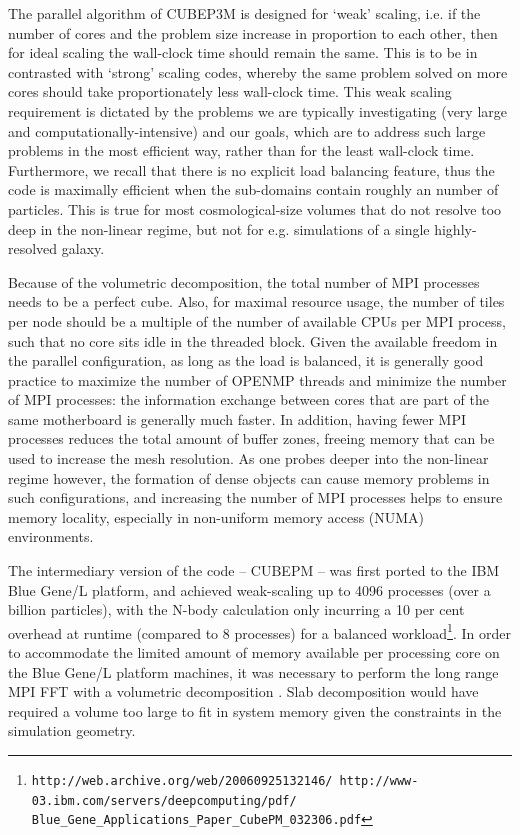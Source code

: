 \documentclass[useAMS,usenatbib]{mn2e}
\begin{document}
The parallel algorithm of {\small CUBEP3M} is designed for `weak' 
scaling, i.e. if the number of cores and the problem size 
increase in proportion to each other, then for ideal scaling the 
wall-clock time should remain the same. This is to be in contrasted with `strong' 
scaling codes, whereby the same problem solved on more cores should take 
proportionately less wall-clock time. This weak scaling requirement 
is dictated by the problems we are typically investigating (very 
large and computationally-intensive) and our goals, which are to 
address such large problems in the most efficient way, rather than 
for the least wall-clock time. Furthermore, we recall that there is no explicit 
load balancing feature, thus the code is maximally efficient when the sub-domains
contain roughly an  number of particles. This is true for most
cosmological-size volumes that do not resolve too deep in the non-linear regime, 
but not for e.g. simulations of a single highly-resolved galaxy. 

Because of the volumetric decomposition, the total number of {\small MPI} processes needs
to be a perfect cube. Also, for maximal resource usage, the number of tiles per node 
should be a multiple of the number of available {\small CPU}s per {\small MPI} process,
such that no core sits idle in the threaded block.
Given the available freedom in the parallel configuration, as long as the load is balanced, it is generally good practice to maximize the number of {\small OPENMP} threads and minimize the number of {\small MPI} processes:
the information exchange between cores that are part of the same motherboard is generally much faster.
In addition, having fewer {\small MPI} processes reduces the total amount of buffer zones, 
freeing memory that can be used to increase the mesh resolution. 
As one probes deeper into the non-linear regime however, 
the formation of dense objects can cause memory problems in such configurations, and increasing 
the number of {\small MPI} processes helps to ensure memory locality,
especially in non-uniform memory access (NUMA) environments.




 The intermediary version of the code -- {\small CUBEPM} --
was first  ported to the IBM Blue Gene/L platform, and achieved 
weak-scaling up to 4096 processes (over a billion particles), with the N-body calculation only incurring a 10 per cent overhead 
at runtime (compared to 8 processes) for a balanced workload\footnote{\tt http://web.archive.org/web/20060925132146/ http://www-03.ibm.com/servers/deepcomputing/pdf/ Blue\_Gene\_Applications\_Paper\_CubePM\_032306.pdf}.  In order to 
accommodate the limited amount of memory available per processing core on the 
Blue Gene/L platform machines, it was necessary to perform the long range {\small MPI FFT}
with a volumetric decomposition \citep{3DFFT}.
Slab decomposition would have required a volume too large to fit in system 
memory given the constraints in the simulation geometry. 
\end{document}
